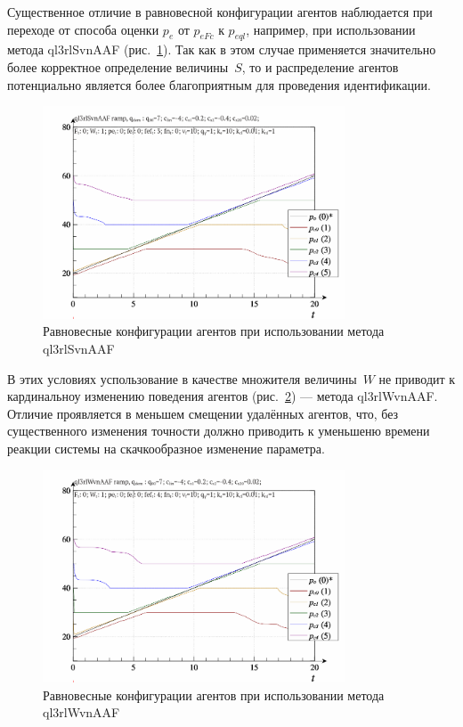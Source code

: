 Существенное отличие в равновесной конфигурации агентов
наблюдается при переходе от способа оценки $p_e$ от $p_{eFc}$ к $p_{eql}$,
например,
при использовании метода ql3rlSvnAAF
(рис.~\ref{atu:f:qls_ramp_ql3rlSvnAAF}).
Так как в этом случае применяется значительно более корректное определение величины~$S$,
то и распределение агентов потенциально является более благоприятным для
проведения идентификации.

\begin{figure}[htb!]
  \centerline{
    \includegraphics[width=0.8\textwidth]{p/ramp/qls-p_t_pi_ql3rlSvnAAF_ramp.png}
  }
  \caption{Равновесные конфигурации агентов при использовании метода ql3rlSvnAAF}
  \label{atu:f:qls_ramp_ql3rlSvnAAF}
\end{figure}


В этих условиях успользование в качестве множителя величины~$W$
не приводит к кардинальноу изменению поведения агентов
(рис.~\ref{atu:f:qls_ramp_ql3rlWvnAAF}) --- метода ql3rlWvnAAF.
Отличие проявляется в меньшем смещении удалённых
агентов, что, без существенного изменения точности
должно приводить к уменьшеню времени реакции системы на скачкообразное
изменение параметра.


\begin{figure}[htb!]
  \centerline{
    \includegraphics[width=0.8\textwidth]{p/ramp/qls-p_t_pi_ql3rlWvnAAF_ramp.png}
  }
  \caption{Равновесные конфигурации агентов при использовании метода ql3rlWvnAAF}
  \label{atu:f:qls_ramp_ql3rlWvnAAF}
\end{figure}

